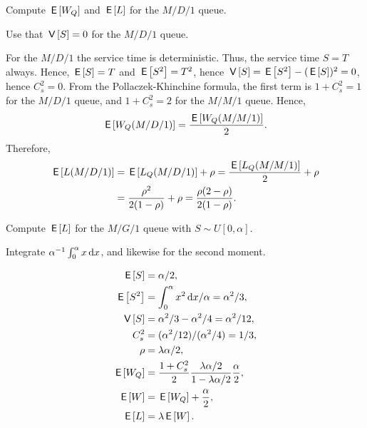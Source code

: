 \begin{extra}
 Compute $\,\mathsf{E}\left[W_Q\right]$ and $\,\mathsf{E}\left[L\right]$ for the $M/D/1$ queue.
\begin{hint}
Use that $\,\mathsf{V}\left[S\right]=0$ for the $M/D/1$ queue.    
\end{hint}
\begin{solution}
 For the $M/D/1$ the service time is deterministic.
 Thus, the service time $S=T$ always.
 Hence, $\,\mathsf{E}\left[S\right] = T$ and $\,\mathsf{E}\left[S^2\right]=T^2$, hence $\,\mathsf{V}\left[S\right] = \,\mathsf{E}\left[S^2\right] - (\,\mathsf{E}\left[S\right])^2 = 0$, hence $C_s^2 = 0$.
 From the Pollaczek-Khinchine formula, the first term is $1+C_s^2=1$ for the $M/D/1$ queue, and $1+C_s^2=2$ for the $M/M/1$ queue.
 Hence,
 \begin{equation*}
\,\mathsf{E}\left[W_Q(M/D/1)\right] = \frac{\,\mathsf{E}\left[W_Q(M/M/1)\right]}2.
\end{equation*}
Therefore,
\begin{align*}
 \,\mathsf{E}\left[L(M/D/1)\right] &= \,\mathsf{E}\left[L_Q(M/D/1)\right] +\rho = \frac{\,\mathsf{E}\left[L_Q(M/M/1)\right]}2 + \rho \\
&= \frac{\rho^2}{2(1-\rho)} + \rho=\frac{\rho(2-\rho)} {2(1-\rho)}.
\end{align*}
\end{solution}
\end{extra}

\begin{extra}
 Compute $\,\mathsf{E}\left[L\right]$ for the $M/G/1$ queue with $S\sim U[0,\alpha]$.
\begin{hint}
Integrate $\alpha^{-1} \int_0^\alpha x \,\text{d}x$, and likewise for the second moment.
\end{hint}
\begin{solution}
 \begin{align*}
\,\mathsf{E}\left[S\right] &= \alpha/2,\\
\,\mathsf{E}\left[S^2\right] &= \int_0^\alpha x^2 \,\text{d}x/\alpha = \alpha^2/3,\\
\,\mathsf{V}\left[S\right] &= \alpha^2/3 - \alpha^2/4= \alpha^2/12,\\
C_s^2 &= (\alpha^2/12)/(\alpha^2/4) = 1/3,\\
\rho &= \lambda \alpha/2,\\
\,\mathsf{E}\left[W_Q\right] &= \frac{1+C_s^2}2 \frac{\lambda \alpha/2}{1-\lambda \alpha/2}\frac \alpha2, \\
\,\mathsf{E}\left[W\right] &= \,\mathsf{E}\left[W_Q\right] + \frac \alpha2,\\
\,\mathsf{E}\left[L\right] &= \lambda \,\mathsf{E}\left[W\right].
 \end{align*}
\end{solution}
\end{extra}

